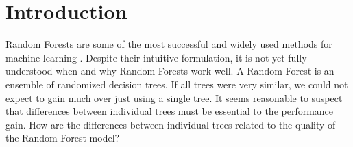\documentclass[
	twoside=false, %
]{kaobook}
\begin{document}

\begingroup %

\setlength{\textheight}{230\vscale} %

\etocstandarddisplaystyle %
\etocstandardlines %

\tableofcontents %


\let\cleardoublepage\bigskip
\let\clearpage\bigskip


\endgroup


\mainmatter %

\renewcommand{\marginlayout}{%
 \newgeometry{
	top=27.4mm,
	bottom=27.4mm,
	inner=24.8mm,
	textwidth=127mm, %
	marginparsep=5.2mm,
	marginparwidth=39.4mm 
 }%
}


\chapter{Introduction}

Random Forests are some of the most successful and widely used methods for machine learning \cite{biau_RandomForestGuided_2016,yang_ReviewEnsembleMethods_2010}. Despite their intuitive formulation, it is not yet fully understood when and why Random Forests work well. 
A Random Forest is an ensemble of randomized decision trees.
If all trees were very similar, we could not expect to gain much over just using a single tree.  
It seems reasonable to suspect that differences between individual trees must be essential to the performance gain. How are the differences between individual trees related to the quality of the Random Forest model?
\end{document}

